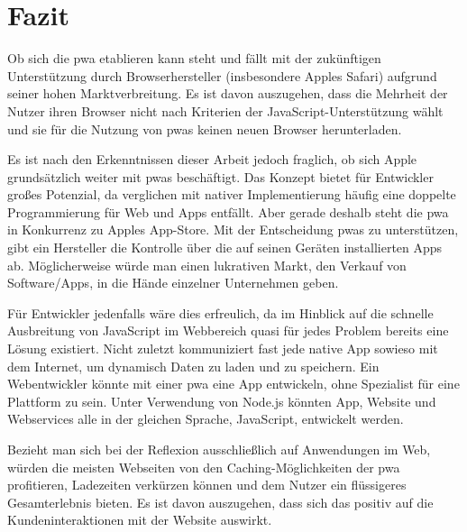 \section{Fazit}

Ob sich die \ac{pwa} etablieren kann steht und fällt mit der zukünftigen Unterstützung durch Browserhersteller (insbesondere Apples Safari) aufgrund seiner hohen Marktverbreitung. Es ist davon auszugehen, dass die Mehrheit der Nutzer ihren Browser nicht nach Kriterien der JavaScript-Unterstützung wählt und sie für die Nutzung von \ac{pwa}s keinen neuen Browser herunterladen.

Es ist nach den Erkenntnissen dieser Arbeit jedoch fraglich, ob sich Apple grundsätzlich weiter mit \ac{pwa}s beschäftigt. Das Konzept bietet für Entwickler großes Potenzial, da verglichen mit nativer Implementierung häufig eine doppelte Programmierung für Web und Apps entfällt. Aber gerade deshalb steht die \ac{pwa} in Konkurrenz zu Apples App-Store. Mit der Entscheidung \ac{pwa}s zu unterstützen, gibt ein Hersteller die Kontrolle über die auf seinen Geräten installierten Apps ab. 
Möglicherweise würde man einen lukrativen Markt, den Verkauf von Software/Apps, in die Hände einzelner Unternehmen geben.

Für Entwickler jedenfalls wäre dies erfreulich, da im Hinblick auf die schnelle Ausbreitung von JavaScript im Webbereich quasi für jedes Problem bereits eine Lösung existiert. Nicht zuletzt kommuniziert fast jede native App sowieso mit dem Internet, um dynamisch Daten zu laden und zu speichern. Ein Webentwickler könnte mit einer \ac{pwa} eine App entwickeln, ohne Spezialist für eine Plattform zu sein. Unter Verwendung von Node.js könnten App, Website und Webservices alle in der gleichen Sprache, JavaScript, entwickelt werden.

Bezieht man sich bei der Reflexion ausschließlich auf Anwendungen im Web, würden die meisten Webseiten von den Caching-Möglichkeiten der \ac{pwa} profitieren, Ladezeiten verkürzen können und dem Nutzer ein flüssigeres Gesamterlebnis bieten. Es ist davon auszugehen, dass sich das positiv auf die Kundeninteraktionen mit der Website auswirkt.

